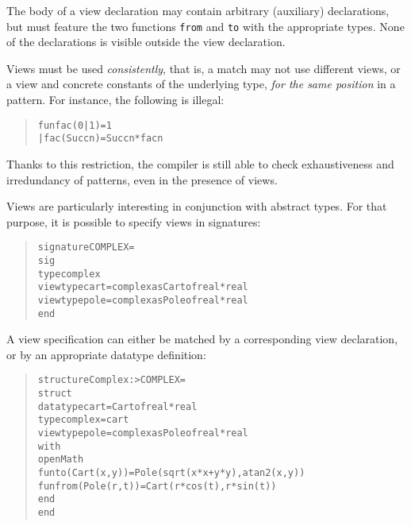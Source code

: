 \documentclass[twoside,titlepage]{article}
\newcommand{\void}[1]{}
\begin{document}
\begin{appendix}
The body of a view declaration may contain arbitrary (auxiliary) declarations, but must feature the two functions {\tt from} and {\tt to} with the appropriate types. None of the declarations is visible outside the view declaration.
\void{Note that it is legal, although rather pointless, for the injection function {\tt to} to be represented directly by a view constructor:

\begin{quote}
\begin{alltt}
viewtype t = int as to of int
with
   datatype t = datatype t   (*) replicates binding for `to'
   fun from (to x) = x
end
\end{alltt}
\end{quote}
}

Views must be used {\em consistently}, that is, a match may not use different views, or a view and concrete constants of the underlying type, {\em for the same position} in a pattern. For instance, the following is illegal:

\begin{quote}
\begin{alltt}
fun fac (0 | 1)  = 1
  | fac (Succ n) = Succ n * fac n
\end{alltt}
\end{quote}

Thanks to this restriction, the compiler is still able to check exhaustiveness and irredundancy of patterns, even in the presence of views.

Views are particularly interesting in conjunction with abstract types. For that purpose, it is possible to specify views in signatures:

\begin{quote}
\begin{alltt}
signature COMPLEX =
sig
   type complex
   viewtype cart = complex as Cart of real * real
   viewtype pole = complex as Pole of real * real
end
\end{alltt}
\end{quote}

A view specification can either be matched by a corresponding view declaration, or by an appropriate datatype definition:

\begin{quote}
\begin{alltt}
structure Complex :> COMPLEX =
struct
   datatype cart = Cart of real * real
   type complex = cart
   viewtype pole = complex as Pole of real * real
   with
      open Math
      fun to(Cart(x,y)) = Pole(sqrt(x*x + y*y), atan2(x,y))
      fun from(Pole(r,t)) = Cart(r*cos(t), r*sin(t))
   end
end
\end{alltt}
\end{quote}


\end{appendix}
\end{document}

